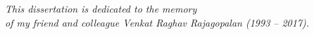\newpage
\vspace*{\fill}
\begin{center}
\textit{This dissertation is dedicated to the memory \\ 
of my friend and colleague Venkat Raghav Rajagopalan (1993 -- 2017).}
\end{center}
\vspace*{\fill}
